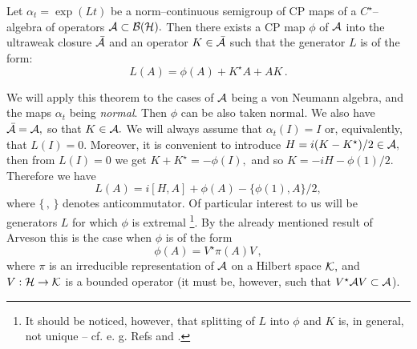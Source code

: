 \documentclass[12pt]{article}
\def\be{\begin{equation}} \def\ee{\end{equation}}
\begin{document}
\begin{theorem}
Let $\alpha_t = \exp  (L t)$ be a
norm--continuous semigroup of CP maps of a
$C^{\star }$-- algebra of operators ${\cal A}\subset {\cal B} ({\cal
H}) . $ Then there exists a CP map $\phi$
of ${\cal A}$ into the ultraweak closure ${\bar {\cal A}}$
and an operator $K\in {\bar {\cal A}}$ such that the
generator $L$ is of the form: 
\be
L (A) = \phi  (A) + K^{\star }A + AK \,  . 
\ee
\end{theorem}
We will apply this theorem to the cases of ${\cal A}$ being a von Neumann
algebra,  and the maps $\alpha_t$ being {\sl normal}.  Then $\phi$ can be
also taken normal.  We also have ${\bar {{\cal A}}} = {\cal A} , $
so that $K\in {\cal A} . $ We will always assume that $\alpha_t  (I) = I $ or, 
equivalently,  that $L (I)=0 . $  Moreover,  it is convenient to introduce $
H=i (K-K^{\star })/2 \in {\cal A}, $ then from $L (I)=0$ we get $K+K^{\star
}=-\phi  (I) , $ and so $K=-iH-\phi  (1)/2 . $ Therefore we have \be
L (A) = i\left[H, A\right]+\phi  (A) -\{ \phi  (1) , A\}/2 ,  \ee         
where $\{\,  ,  \,  \}$ denotes anticommutator.  Of particular interest to us
will be generators $L$ for which $\phi$ is extremal \footnote{It should 
be noticed, 
however,  that splitting of $L$ into $\phi$ and $K$ is,  in general,  not
unique -- cf.  e. g.  Refs \cite{dav} and \cite[Ch. III. 29--30]{par}. }.  
By the already
mentioned result of Arveson \cite{arv} this is the case when $\phi$ is
of the form \be
\phi  (A)=V^{\star }\pi  (A) V \,  ,  \ee   
where $\pi$ is an irreducible representation of ${\cal A}$ on a Hilbert
space ${\cal K} , $ and $V: {\cal H}\rightarrow {\cal K}$ is a bounded
operator  (it must be,  however,  such that $V^{\star}{\cal A} V \subset 
{\cal A
}$).  
\end{document}
